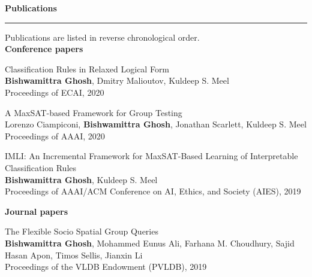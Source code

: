 \documentclass[a4paper,11pt,final]{article}
\newcommand{\Sep}{\vspace{1.5em}}
\newcommand{\SmallSep}{\vspace{0.5em}}
\begin{document}
\Sep
\Large { \textbf{Publications}}\\
\noindent\rule{\textwidth}{1pt}
\normalsize
Publications are listed in reverse chronological order.\\


	

	
	
\SmallSep
\textbf{Conference papers}\\

	\begin{enumerate}[{[C}1{]}]
		\item {Classification Rules in Relaxed Logical Form} \\
		\textbf{Bishwamittra Ghosh}, Dmitry Malioutov, Kuldeep S. Meel\\
		Proceedings of ECAI, 2020
		\item 	{A MaxSAT-based Framework for Group Testing} \\
		Lorenzo Ciampiconi, \textbf{Bishwamittra Ghosh}, Jonathan Scarlett, Kuldeep S. Meel\\
		Proceedings of AAAI, 2020
		\item {IMLI: An Incremental Framework for MaxSAT-Based Learning of Interpretable \\ Classification Rules}\\
		\textbf{Bishwamittra Ghosh}, Kuldeep S. Meel\\
		Proceedings of AAAI/ACM Conference on AI, Ethics, and Society (AIES), 2019
	\end{enumerate}

\newpage

\textbf{Journal papers}

\begin{enumerate}[{[J}1{]}]
	\item 	{The Flexible Socio Spatial Group Queries}\\
	\textbf{Bishwamittra Ghosh}, Mohammed Eunus Ali, Farhana M. Choudhury,
	Sajid Hasan Apon, Timos Sellis, Jianxin Li\\
	Proceedings of the VLDB Endowment (PVLDB), 2019\\
\end{enumerate}



%
\end{document}
